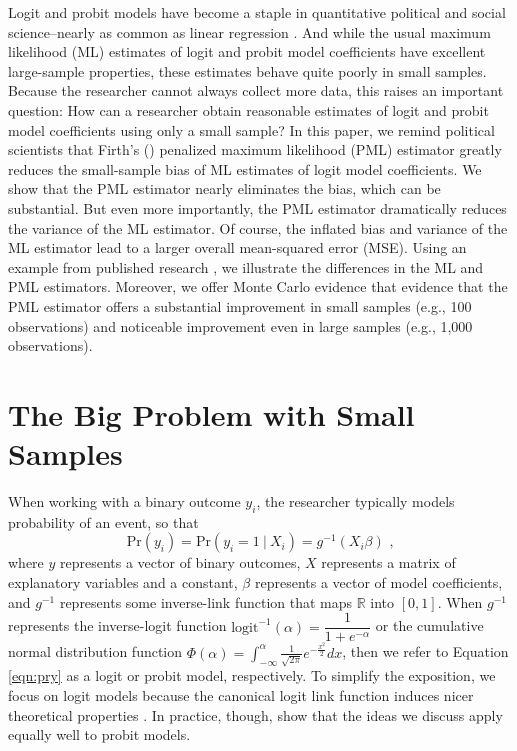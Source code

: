 \documentclass[12pt]{article}
\begin{document}
 \vspace{5mm}
 \begin{center}
 \end{center}

\thispagestyle{empty}

\newpage
\doublespace


Logit and probit models have become a staple in quantitative political and social science--nearly as common as linear regression \citep{KruegerLewisBeck2008}. 
And while the usual maximum likelihood (ML) estimates of logit and probit model coefficients have excellent large-sample properties, these estimates behave quite poorly in small samples. 
Because the researcher cannot always collect more data, this raises an important question: How can a researcher obtain reasonable estimates of logit and probit model coefficients using only a small sample?
In this paper, we remind political scientists that Firth's (\citeyear{Firth1993}) penalized maximum likelihood (PML) estimator greatly reduces the small-sample bias of ML estimates of logit model coefficients. 
We show that the PML estimator nearly eliminates the bias, which can be substantial. 
But even more importantly, the PML estimator dramatically reduces the variance of the ML estimator. 
Of course, the inflated bias and variance of the ML estimator lead to a larger overall mean-squared error (MSE). 
Using an example from published research \citep{GeorgeEpstein1992}, we illustrate the differences in the ML and PML estimators.
Moreover, we offer Monte Carlo evidence that evidence that the PML estimator offers a substantial improvement in small samples (e.g., 100 observations) and noticeable improvement even in large samples (e.g., 1,000 observations).

\section*{The Big Problem with Small Samples}

When working with a binary outcome $y_i$, the researcher typically models probability of an event, so that
\begin{equation}\label{eqn:pry}
\text{Pr}(y_i) = \text{Pr}(y_i = 1~|~ X_i) =  g^{-1}(X_i\beta)\text{ ,}
\end{equation}
where $y$ represents a vector of binary outcomes, $X$ represents a matrix of explanatory variables and a constant, $\beta$ represents a vector of model coefficients, and $g^{-1}$ represents some inverse-link function that maps $\mathbb{R}$ into $[0, 1]$. 
When $g^{-1}$ represents the inverse-logit function $\text{logit}^{-1}(\alpha) = \dfrac{1}{1 + e^{-\alpha}}$ or the cumulative normal distribution function $\Phi(\alpha) = \int_{-\infty}^\alpha \frac{1}{\sqrt{2\pi}}e^{-\frac{x^2}{2}}dx$, then we refer to Equation \ref{eqn:pry} as a logit or probit model, respectively.
To simplify the exposition, we focus on logit models because the canonical logit link function induces nicer theoretical properties \citep[pp. 31-32]{McCullaghNelder1989}. 
In practice, though, \cite{KosmidisFirth2009} show that the ideas we discuss apply equally well to probit models.
\end{document}

